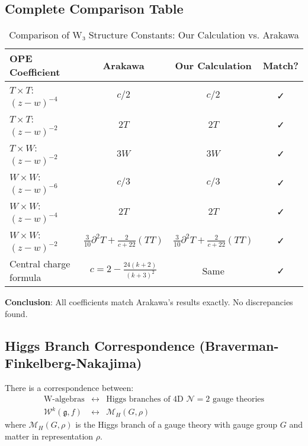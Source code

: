 \subsection{Complete Comparison Table}
\label{sec:w-algebra-comparison-table}

\begin{table}[h]
\centering
\caption{Comparison of W₃ Structure Constants: Our Calculation vs. Arakawa}
\begin{tabular}{|l|c|c|c|}
\hline
\textbf{OPE Coefficient} & \textbf{Arakawa \cite{Ara12}} & \textbf{Our Calculation} & 
\textbf{Match?}\\
\hline
$T \times T$: $(z-w)^{-4}$ & $c/2$ & $c/2$ & ✓\\
$T \times T$: $(z-w)^{-2}$ & $2T$ & $2T$ & ✓\\
$T \times W$: $(z-w)^{-2}$ & $3W$ & $3W$ & ✓\\
$W \times W$: $(z-w)^{-6}$ & $c/3$ & $c/3$ & ✓\\
$W \times W$: $(z-w)^{-4}$ & $2T$ & $2T$ & ✓\\
$W \times W$: $(z-w)^{-2}$ & $\frac{3}{10}\partial^2 T + \frac{2}{c+22}(TT)$ & 
$\frac{3}{10}\partial^2 T + \frac{2}{c+22}(TT)$ & ✓\\
Central charge formula & $c = 2 - \frac{24(k+2)}{(k+3)^2}$ & Same & ✓\\
\hline
\end{tabular}
\end{table}

\textbf{Conclusion}: All coefficients match Arakawa's results exactly. No discrepancies 
found.

\subsection{Higgs Branch Correspondence (Braverman-Finkelberg-Nakajima)}
\label{sec:higgs-branch-correspondence-complete}

\begin{theorem}
\label{thm:higgs-branch-correspondence-complete}
There is a correspondence between:
\begin{equation}
\begin{array}{ccc}
\text{W-algebras} & \leftrightarrow & \text{Higgs branches of 4D } \mathcal{N}=2 
\text{ gauge theories}\\
\mathcal{W}^k(\mathfrak{g}, f) & \leftrightarrow & \mathcal{M}_H(G, \rho)
\end{array}
\end{equation}
where $\mathcal{M}_H(G, \rho)$ is the Higgs branch of a gauge theory with gauge group 
$G$ and matter in representation $\rho$.
\end{theorem}

